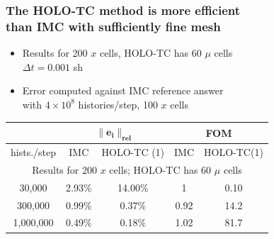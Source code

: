 \documentclass[xcolor=dvipsnames,hyperref={pdfpagelabels=false},unknownkeysallowed]{beamer}
\newcommand{\colG}[1]{{\color{Gray!110} #1}}
\newlength{\wideitemsep}
\let\olditem\item
\renewcommand{\item}{\setlength{\itemsep}{\wideitemsep}\olditem}
\begin{document}
\begin{frame}
    \frametitle{The HOLO-TC method is more efficient  \\ than IMC with sufficiently fine mesh}
    \begin{itemize}
        \item Results for 200 $x$ cells, HOLO-TC has 60 $\mu$ cells \\ \colG{ $\Delta t =
            0.001$ sh}
        \item Error computed against IMC reference answer \\  with $4\times10^8$
            histories/step, 100 $x$ cells
    \end{itemize}
    \begin{table}
\begin{tabular}{|c|cc|cc|}\cline{2-5}
    \multicolumn{1}{c|}{}       & \multicolumn{2}{|c|}{$\mathbf{\|e_i\|_{rel}}$} &
    \multicolumn{2}{|c|}{\textbf{FOM}} \\ \hline
hists./step   & IMC     & HOLO-TC (1) &    IMC   & HOLO-TC(1)  \\ \hline
\multicolumn{5}{|c|}{Results for 200 $x$ cells; HOLO-TC has 60 $\mu$ cells} \\ \hline
   30,000     & 2.93\%  & 14.00\%    & 1      &  0.10      \\
  300,000     & 0.99\%  & 0.37\%    & 0.92   &  14.2      \\ 
  1,000,000   & 0.49\%  & 0.18\%    & 1.02   &  81.7      \\ \hline
\end{tabular}
\end{table}

\end{frame}
\end{document}
